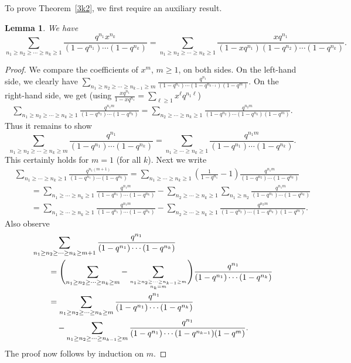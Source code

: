 \documentclass[pdftex]{sigma}
\numberwithin{equation}{section}
\newtheorem{Lemma}[Theorem]{Lemma}
\theoremstyle{definition}
\begin{document}
To prove Theorem~\ref{3k2}, we first require an auxiliary result.
\begin{Lemma} \label{qz} We have
\[
\sum_{n_1 \geq n_2 \geq \cdots \geq n_k \geq 1} \frac{q^{n_1} x^{n_k}}{(1-q^{n_1}) \cdots (1-q^{n_k})}=\sum_{n_1 \geq n_2 \geq \cdots \geq n_k \geq 1} \frac{x q^{n_1}}{(1-x q^{n_1})(1-q^{n_2}) \cdots (1-q^{n_k})}.
\]
\end{Lemma}
\begin{proof} We compare the coefficients of $x^{m}$, $m \geq 1$, on both sides. On the left-hand side, we clearly have
$\sum_{n_1 \geq n_2 \geq \cdots \geq n_{k-1} \geq m} \frac{q^{n_1}}{(1-q^{n_1}) \cdots (1-q^{n_{k-1}})(1-q^{m})}$. On the right-hand side, we
get (using $\frac{xq^{n_1}}{1-x q^{n_1}}=\sum_{\ell \geq 1} x^\ell q^{n_1 \ell}$)
\begin{align*}
 \sum_{n_1 \geq n_2 \geq \cdots \geq n_k \geq 1} \frac{q^{n_1 m}}{(1-q^{n_2}) \cdots (1-q^{n_k})}
 =\sum_{ n_2 \geq \cdots \geq n_k \geq 1} \frac{q^{n_2 m}}{(1-q^{n_2}) \cdots (1-q^{n_k})(1-q^m)}.
\end{align*}
Thus it remains to show
\[
\sum_{n_1 \geq n_2 \geq \cdots \geq n_{k} \geq m} \frac{q^{n_1}}{(1-q^{n_1}) \cdots (1-q^{n_{k}})}=\sum_{ n_1 \geq \cdots \geq n_k \geq 1} \frac{q^{n_1 m}}{(1-q^{n_1}) \cdots (1-q^{n_k})}.
\]
This certainly holds for $m=1$ (for all $k$). Next we write
\begin{align*}
& \sum_{ n_1 \geq \cdots \geq n_k \geq 1} \frac{q^{n_1 (m+1)}}{(1-q^{n_1}) \cdots (1-q^{n_k})}=\sum_{ n_1 \geq \cdots \geq n_k \geq 1} \left(\frac{1}{1-q^{n_1}}-1 \right) \frac{q^{n_1 m}}{(1-q^{n_2}) \cdots (1-q^{n_k})} \\
& \qquad = \sum_{ n_1 \geq \cdots \geq n_k \geq 1} \frac{q^{n_1 m}}{(1-q^{n_1}) \cdots (1-q^{n_k})} - \sum_{ n_2 \geq \cdots \geq n_{k} \geq 1} \sum_{n_1 \geq n_2}
\frac{q^{n_1 m}}{(1-q^{n_1}) \cdots (1-q^{n_k})} \\
& \qquad = \sum_{ n_1 \geq \cdots \geq n_k \geq 1} \frac{q^{n_1 m}}{(1-q^{n_1}) \cdots (1-q^{n_k})} - \sum_{ n_2 \geq \cdots \geq n_{k} \geq 1}
\frac{q^{n_2 m}}{(1-q^{n_2}) \cdots (1-q^{n_k})(1-q^m)}.
\end{align*}
Also observe
\begin{align*}
& \sum_{n_1 \geq n_2 \geq \cdots \geq n_{k} \geq m+1} \frac{q^{n_1}}{(1-q^{n_1}) \cdots (1-q^{n_{k}})} \\
& \qquad =\Biggl( \sum_{n_1 \geq n_2 \geq \cdots \geq n_{k} \geq m} - \sum_{n_1 \geq n_2 \geq \cdots \geq n_{k-1} \geq m \atop n_{k}= m} \Biggr) \frac{q^{n_1}}{(1-q^{n_1}) \cdots (1-q^{n_{k}})} \\
&\qquad =\sum_{n_1 \geq n_2 \geq \cdots \geq n_{k} \geq m} \frac{q^{n_1}}{(1-q^{n_1}) \cdots (1-q^{n_{k}})} \\
& \qquad\quad-\sum_{n_1 \geq n_2 \geq \cdots \geq n_{k-1} \geq m} \frac{q^{n_1}}{(1-q^{n_1}) \cdots (1-q^{n_{k-1}})(1-q^m)}.
\end{align*}
The proof now follows by induction on $m$.
\end{proof}
\end{document}
